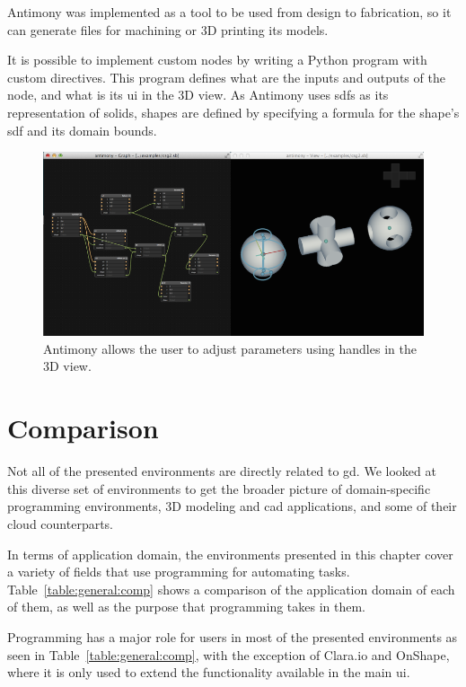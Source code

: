 Antimony was implemented as a tool to be used from design to fabrication, so it can generate files for machining or 3D printing its models.

It is possible to implement custom nodes by writing a Python program with custom directives.
This program defines what are the inputs and outputs of the node, and what is its \gls{ui} in the 3D view.
As Antimony uses \glspl{sdf} as its representation of solids, shapes are defined by specifying a formula for the shape's \gls{sdf} and its domain bounds.

\begin{figure}
	\centering
	\includegraphics[width=1.0\textwidth]{images/antimony_ui_handles}
	\caption{Antimony allows the user to adjust parameters using handles in the 3D view.}
	\label{fig:antimony:handles}
\end{figure}


\section{Comparison}
Not all of the presented environments are directly related to \gls{gd}.
We looked at this diverse set of environments to get the broader picture of domain-specific programming environments, 3D modeling and \gls{cad} applications, and some of their cloud counterparts.

In terms of application domain, the environments presented in this chapter cover a variety of fields that use programming for automating tasks.
Table~\ref{table:general:comp} shows a comparison of the application domain of each of them, as well as the purpose that programming takes in them.

Programming has a major role for users in most of the presented environments as seen in Table~\ref{table:general:comp}, with the exception of Clara.io and OnShape, where it is only used to extend the functionality available in the main \gls{ui}.

